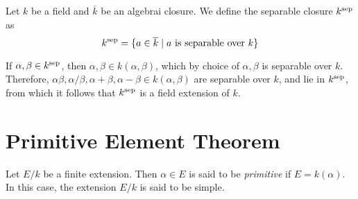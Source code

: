 \begin{definition}
    Let $k$ be a field and $\overline k$ be an algebrai closure. We define the separable closure $k^{\text{sep}}$ as 
    \begin{equation*}
        k^{\text{sep}} = \{a\in\overline k\mid\text{$a$ is separable over $k$}\}
    \end{equation*}
\end{definition}

If $\alpha,\beta\in k^{\text{sep}}$, then $\alpha,\beta\in k(\alpha,\beta)$, which by choice of $\alpha,\beta$ is separable over $k$. Therefore, $\alpha\beta,\alpha/\beta,\alpha + \beta,\alpha - \beta\in k(\alpha,\beta)$ are separable over $k$, and lie in $k^{\text{sep}}$, from which it follows that $k^{\text{sep}}$ is a field extension of $k$.

\section*{Primitive Element Theorem}

\begin{definition}
    Let $E/k$ be a finite extension. Then $\alpha\in E$ is said to be \textit{primitive} if $E = k(\alpha)$. In this case, the extension $E/k$ is said to be simple.
\end{definition}

